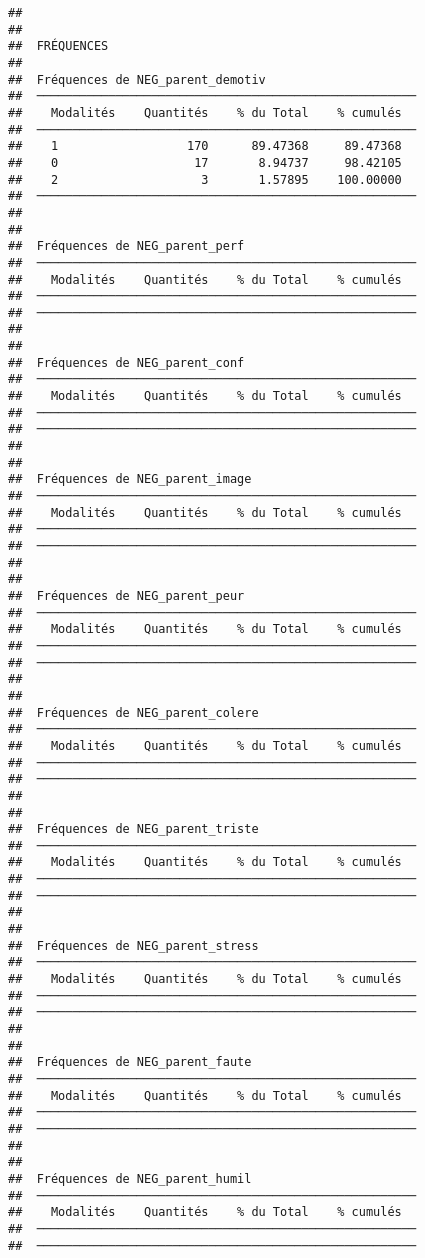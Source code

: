 \documentclass[
]{article}
\begin{document}
\begin{verbatim}
## 
## 
##  FRÉQUENCES
## 
##  Fréquences de NEG_parent_demotiv                      
##  ───────────────────────────────────────────────────── 
##    Modalités    Quantités    % du Total    % cumulés   
##  ───────────────────────────────────────────────────── 
##    1                  170      89.47368     89.47368   
##    0                   17       8.94737     98.42105   
##    2                    3       1.57895    100.00000   
##  ───────────────────────────────────────────────────── 
## 
## 
##  Fréquences de NEG_parent_perf                         
##  ───────────────────────────────────────────────────── 
##    Modalités    Quantités    % du Total    % cumulés   
##  ───────────────────────────────────────────────────── 
##  ───────────────────────────────────────────────────── 
## 
## 
##  Fréquences de NEG_parent_conf                         
##  ───────────────────────────────────────────────────── 
##    Modalités    Quantités    % du Total    % cumulés   
##  ───────────────────────────────────────────────────── 
##  ───────────────────────────────────────────────────── 
## 
## 
##  Fréquences de NEG_parent_image                        
##  ───────────────────────────────────────────────────── 
##    Modalités    Quantités    % du Total    % cumulés   
##  ───────────────────────────────────────────────────── 
##  ───────────────────────────────────────────────────── 
## 
## 
##  Fréquences de NEG_parent_peur                         
##  ───────────────────────────────────────────────────── 
##    Modalités    Quantités    % du Total    % cumulés   
##  ───────────────────────────────────────────────────── 
##  ───────────────────────────────────────────────────── 
## 
## 
##  Fréquences de NEG_parent_colere                       
##  ───────────────────────────────────────────────────── 
##    Modalités    Quantités    % du Total    % cumulés   
##  ───────────────────────────────────────────────────── 
##  ───────────────────────────────────────────────────── 
## 
## 
##  Fréquences de NEG_parent_triste                       
##  ───────────────────────────────────────────────────── 
##    Modalités    Quantités    % du Total    % cumulés   
##  ───────────────────────────────────────────────────── 
##  ───────────────────────────────────────────────────── 
## 
## 
##  Fréquences de NEG_parent_stress                       
##  ───────────────────────────────────────────────────── 
##    Modalités    Quantités    % du Total    % cumulés   
##  ───────────────────────────────────────────────────── 
##  ───────────────────────────────────────────────────── 
## 
## 
##  Fréquences de NEG_parent_faute                        
##  ───────────────────────────────────────────────────── 
##    Modalités    Quantités    % du Total    % cumulés   
##  ───────────────────────────────────────────────────── 
##  ───────────────────────────────────────────────────── 
## 
## 
##  Fréquences de NEG_parent_humil                        
##  ───────────────────────────────────────────────────── 
##    Modalités    Quantités    % du Total    % cumulés   
##  ───────────────────────────────────────────────────── 
##  ─────────────────────────────────────────────────────
\end{verbatim}
\end{document}
